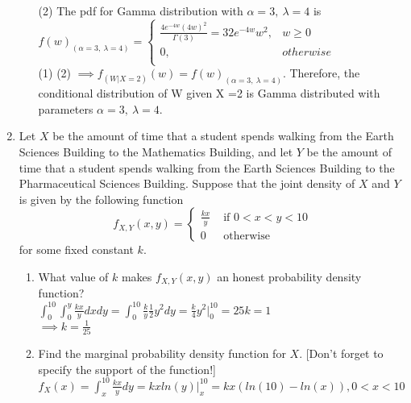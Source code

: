 \documentclass[11pt]{article}
\begin{document}
\begin{enumerate}[label=\textbf{Question \arabic*:},start=1]
\begin{enumerate}
(2) The pdf for Gamma distribution with $\alpha=3,\ \lambda=4$ is \\
$f(w)_{(\alpha=3,\ \lambda=4)} = \begin{cases}
		\frac{4 e^{-4w} (4w)^2}{\Gamma(3) } = 32 e^{-4w} w^2, & w \geq 0 \\ 
		0, & otherwise\\
		\end{cases}$\\


(1) (2) $\implies f_{(W | X = 2)}(w) = f(w)_{(\alpha=3,\ \lambda=4)}$. Therefore, the conditional distribution of W given X =2 is Gamma distributed with parameters $\alpha=3,\ \lambda=4$.

\end{enumerate}




\item Let $X$ be the amount of time that a student spends walking from the Earth Sciences Building to the Mathematics Building, and let $Y$ be the amount of time that a student spends walking from the Earth Sciences Building to the Pharmaceutical Sciences Building. Suppose that the joint density of $X$ and $Y$ is given by the following function
\[
f_{X,Y}(x,y) = \left\{
\begin{array}{ll}
\frac {kx}y & \mbox{ if } 0 < x < y < 10 \\
0 & \mbox{ otherwise} 
\end{array}
\right.
\]
for some fixed constant $k$. 
\begin{enumerate}
	\item What value of $k$ makes $f_{X,Y}(x,y)$ an honest probability density function?\\
	
	$\displaystyle{ \int_{0}^{10} \int_{0}^{y} \frac{kx}{y} dx dy = \int_{0}^{10} \frac{k}{y} \frac{1}{2} y^2 dy = \frac{k}{4} y^2|_{0}^{10}= 25k = 1 }$ \\
	$\displaystyle{ \implies k = \frac{1}{25} }$ \\

	\item Find the marginal probability density function for $X$. [Don't forget to specify the support of the function!]\\
	
	$\displaystyle{ f_X(x) = \int_{x}^{10} \frac{kx}{y} dy = kx ln(y)|_{x}^{10} = kx (ln(10) - ln(x)), 0 < x <10 }$\\
	

\end{enumerate}
\end{enumerate}
\end{document}
